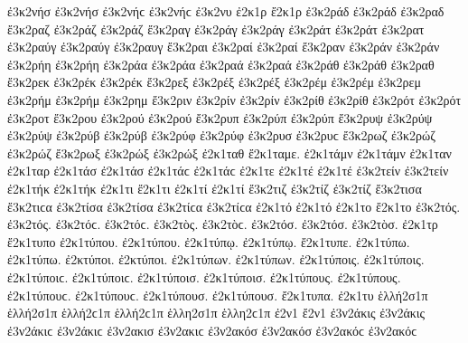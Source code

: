 {ἐ3κ2νήσ ἐ3κ2νήσ ἐ3κ2νήϲ ἐ3κ2νήϲ   %
ἐ3κ2νυ   %
ἐ2κ1ρ 
ἔ2κ1ρ 
ἐ3κ2ράδ ἐ3κ2ράδ   %
ἐ3κ2ραδ 
ἔ3κ2ραζ   %
ἐ3κ2ράζ ἐ3κ2ράζ 
ἔ3κ2ραγ   %
ἐ3κ2ράγ ἐ3κ2ράγ 
ἐ3κ2ράτ ἐ3κ2ράτ   %
ἐ3κ2ρατ 
ἐ3κ2ραύγ ἐ3κ2ραύγ   %
ἐ3κ2ραυγ 
ἔ3κ2ραι   %
ἐ3κ2ραί ἐ3κ2ραί 
ἔ3κ2ραν   %
ἐ3κ2ράν ἐ3κ2ράν 
ἐ3κ2ρήη ἐ3κ2ρήη   %
ἐ3κ2ράα ἐ3κ2ράα 
ἐ3κ2ραά ἐ3κ2ραά 
ἐ3κ2ράθ ἐ3κ2ράθ   %
ἐ3κ2ραθ 
ἔ3κ2ρεκ   %
ἐ3κ2ρέκ ἐ3κ2ρέκ 
ἔ3κ2ρεξ   %
ἐ3κ2ρέξ ἐ3κ2ρέξ 
ἐ3κ2ρέμ ἐ3κ2ρέμ   %
ἐ3κ2ρεμ 
ἐ3κ2ρήμ ἐ3κ2ρήμ   %
ἐ3κ2ρημ 
ἔ3κ2ριν   %
ἐ3κ2ρίν ἐ3κ2ρίν 
ἐ3κ2ρίθ ἐ3κ2ρίθ 
ἐ3κ2ρότ ἐ3κ2ρότ   %
ἐ3κ2ροτ 
ἔ3κ2ρου   %
ἐ3κ2ρού ἐ3κ2ρού 
ἔ3κ2ρυπ   %
ἐ3κ2ρύπ ἐ3κ2ρύπ   %
ἔ3κ2ρυψ 
ἐ3κ2ρύψ ἐ3κ2ρύψ 
ἐ3κ2ρύβ ἐ3κ2ρύβ 
ἐ3κ2ρύφ ἐ3κ2ρύφ 
ἐ3κ2ρυσ ἐ3κ2ρυϲ   %
ἔ3κ2ρωζ   %
ἐ3κ2ρώζ ἐ3κ2ρώζ 
ἔ3κ2ρωξ   %
ἐ3κ2ρώξ ἐ3κ2ρώξ 
ἐ2κ1ταθ   %
ἔ2κ1ταμε.   %
ἐ2κ1τάμν ἐ2κ1τάμν   %
ἐ2κ1ταν   %
ἐ2κ1ταρ   %
ἐ2κ1τάσ ἐ2κ1τάσ ἐ2κ1τάϲ ἐ2κ1τάϲ   %
ἐ2κ1τε 
ἐ2κ1τέ ἐ2κ1τέ 
ἐ3κ2τείν ἐ3κ2τείν   %
ἐ2κ1τήκ ἐ2κ1τήκ   %
ἐ2κ1τι 
ἔ2κ1τι 
ἐ2κ1τί ἐ2κ1τί 
ἔ3κ2τιζ   %
ἐ3κ2τίζ ἐ3κ2τίζ 
ἔ3κ2τισα ἔ3κ2τιϲα   %
ἐ3κ2τίσα ἐ3κ2τίσα ἐ3κ2τίϲα ἐ3κ2τίϲα 
ἐ2κ1τό ἐ2κ1τό 
ἐ2κ1το 
ἔ2κ1το 
ἐ3κ2τός. ἐ3κ2τός. ἐ3κ2τόϲ. ἐ3κ2τόϲ.   %
ἐ3κ2τὸς. ἐ3κ2τὸϲ. 
ἐ3κ2τόσ. ἐ3κ2τόσ. 
ἐ3κ2τὸσ. 
ἐ2κ1τρ 
ἔ2κ1τυπο   %
ἐ2κ1τύπου. ἐ2κ1τύπου. 
ἐ2κ1τύπῳ. ἐ2κ1τύπῳ. 
ἔ2κ1τυπε. 
ἐ2κ1τύπω. ἐ2κ1τύπω. 
ἐ2κτύποι. ἐ2κτύποι. 
ἐ2κ1τύπων. ἐ2κ1τύπων. 
ἐ2κ1τύποις. ἐ2κ1τύποις. ἐ2κ1τύποιϲ. ἐ2κ1τύποιϲ. 
ἐ2κ1τύποισ. ἐ2κ1τύποισ. 
ἐ2κ1τύπους. ἐ2κ1τύπους. ἐ2κ1τύπουϲ. ἐ2κ1τύπουϲ. 
ἐ2κ1τύπουσ. ἐ2κ1τύπουσ. 
ἔ2κ1τυπα. 
ἐ2κ1τυ 
ἑλλή2σ1π ἑλλή2σ1π ἑλλή2ϲ1π ἑλλή2ϲ1π   %
ἑλλη2σ1π ἑλλη2ϲ1π 
ἐ2ν1 
ἔ2ν1 
ἐ3ν2άκις ἐ3ν2άκις ἐ3ν2άκιϲ ἐ3ν2άκιϲ   %
ἐ3ν2ακισ ἐ3ν2ακιϲ   %
ἐ3ν2ακόσ ἐ3ν2ακόσ ἐ3ν2ακόϲ ἐ3ν2ακόϲ   %
}
